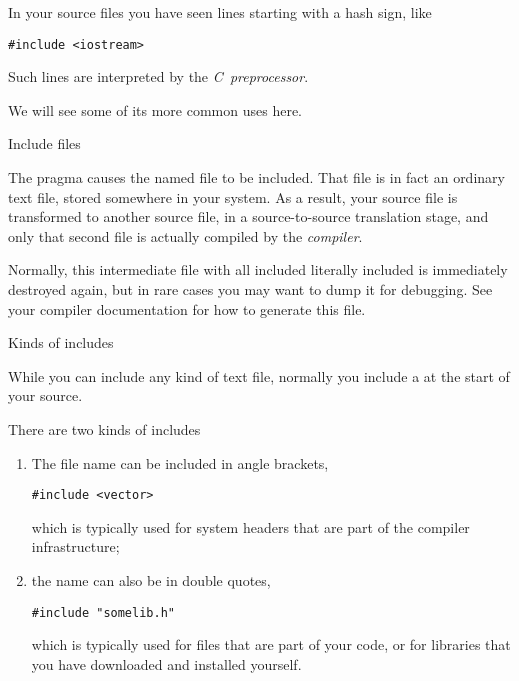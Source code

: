 
In your source files you have seen lines starting with a hash sign,
like
\begin{lstlisting}
#include <iostream>
\end{lstlisting}
Such lines are interpreted by the
%
\emph{C~preprocessor}.

We will see some of its more common uses here.

 {Include files}

The  pragma causes the named file to be included.
That file is in fact an ordinary text file, stored somewhere in your system.
As a result,
your source file is transformed to another source file, in a
source-to-source translation stage,
and only that second file is actually compiled by the
%
\emph{compiler}.

Normally, this intermediate file with all included literally included
is immediately destroyed again, but
in rare cases you may want to dump it for debugging.
See your compiler documentation for how to generate this file.

 {Kinds of includes}

While you can include any kind of text file,
normally you include a
at the start of your source.

There are two kinds of includes
\begin{enumerate}
\item The file name can be included in angle brackets,
\begin{lstlisting}
#include <vector>
\end{lstlisting}
  which is typically used for system headers that are part of the
  compiler infrastructure;
\item the name can also be in double quotes,
\begin{lstlisting}
#include "somelib.h"
\end{lstlisting}
  which is typically used for files that are part of your code,
  or for libraries that you have downloaded and installed yourself.
\end{enumerate}

